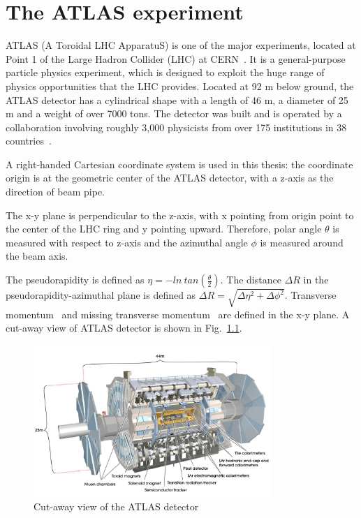 \chapter{The ATLAS experiment}

\label{ch:atlas}
\par ATLAS (A Toroidal LHC ApparatuS) is one of the major experiments, located at Point 1 of the Large Hadron Collider (LHC) at CERN~\cite{Aad:2008zzm}. It is a general-purpose particle physics experiment, which is designed to exploit the huge range of physics opportunities that the LHC provides. Located at 92 m below ground, the ATLAS detector has a cylindrical shape with a length of 46 m, a diameter of 25 m and a weight of over 7000 tons.
 The detector was built and is operated by a collaboration involving roughly 3,000 physicists from over 175 institutions in 38 countries~\cite{fact}.

\par A right-handed Cartesian coordinate system is used in this thesis: the coordinate origin is at the geometric center of the ATLAS detector, with a z-axis as the direction of beam pipe.

\par The x-y plane is perpendicular to the z-axis, with x pointing from origin point to the center of the LHC ring and y pointing upward. Therefore, polar angle $\theta$ is measured with respect to z-axis and the azimuthal angle $\phi$ is measured around the beam axis. 

\par The pseudorapidity is defined as $\eta = -ln~tan(\frac{\theta}{2})$. The distance $\Delta R$ in the pseudorapidity-azimuthal plane is defined as $\Delta R = \sqrt{\Delta\eta^2 + \Delta\phi^2}$. Transverse momentum \pt~and missing transverse momentum \met~are defined in the x-y plane. A cut-away view of ATLAS detector is shown in Fig.~\ref{fig:cutaway}.

\begin{figure}[htbp]
    \centering
    \includegraphics[width=0.8\textwidth]{chapters/c4/figures/atlas.jpg}
    \caption{Cut-away view of the ATLAS detector}
    \label{fig:cutaway}
\end{figure}

